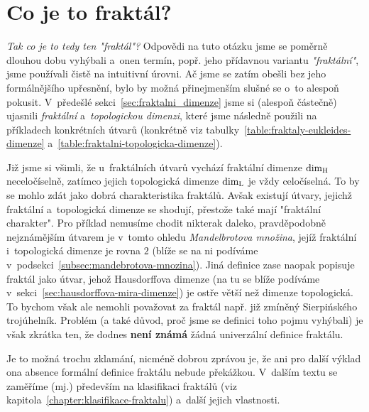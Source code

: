 \section{Co je to fraktál?}\label{sec:co-je-to-fraktal}
\emph{Tak co je to tedy ten "fraktál"?} Odpovědi na tuto otázku jsme se poměrně dlouhou dobu vyhýbali a~onen termín, popř. jeho přídavnou variantu \emph{"fraktální"}, jsme používali čistě na intuitivní úrovni. Ač jsme se zatím obešli bez jeho formálnějšího upřesnění, bylo by možná přinejmenším slušné se o~to alespoň pokusit. V~předešlé sekci~\ref{sec:fraktalni_dimenze} jsme si (alespoň částečně) ujasnili \emph{fraktální} a~\emph{topologickou dimenzi}, které jsme následně použili na příkladech konkrétních útvarů (konkrétně viz tabulky~\ref{table:fraktaly-eukleides-dimenze} a~\ref{table:fraktalni-topologicka-dimenze}).

Již jsme si všimli, že u~fraktálních útvarů vychází fraktální dimenze $\operatorname{dim_H}$ neceločíselně, zatímco jejich topologická dimenze $\operatorname{dim_L}$ je vždy celočíselná. To by se mohlo zdát jako dobrá charakteristika fraktálů. Avšak existují útvary, jejichž fraktální a~topologická dimenze se shodují, přestože také mají "fraktální charakter". Pro příklad nemusíme chodit nikterak daleko, pravděpodobně nejznámějším útvarem je v~tomto ohledu \emph{Mandelbrotova množina}, jejíž fraktální i~topologická dimenze je rovna $2$ (blíže se na ni podíváme v~podsekci~\ref{subsec:mandebrotova-mnozina}). Jiná definice zase naopak popisuje fraktál jako útvar, jehož Hausdorffova dimenze (na tu se blíže podíváme v~sekci~\ref{sec:hausdorffova-mira-dimenze}) je ostře větší než dimenze topologická. To bychom však ale nemohli považovat za fraktál např. již zmíněný Sierpińského trojúhelník. Problém (a také důvod, proč jsme se definici toho pojmu vyhýbali) je však zkrátka ten, že dodnes \textbf{není známá} žádná univerzální definice fraktálu. \cite[str. 226]{Voracova2022}

Je to možná trochu zklamání, nicméně dobrou zprávou je, že ani pro další výklad ona absence formální definice fraktálu nebude překážkou. V~dalším textu se zaměříme (mj.) především na klasifikaci fraktálů (viz kapitola~\ref{chapter:klasifikace-fraktalu}) a~další jejich vlastnosti.